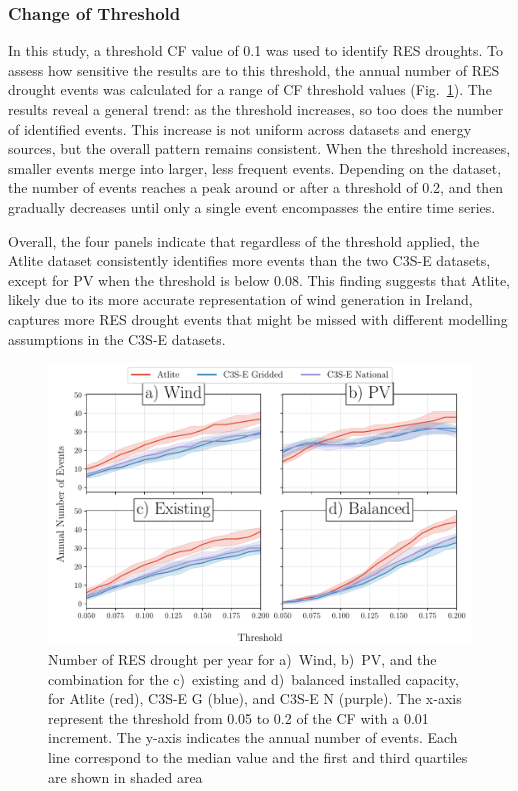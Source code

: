 \documentclass[a4paper, 11pt]{article}
\begin{document}
\newpage
\subsubsection{Change of Threshold}

In this study, a threshold CF value of 0.1 was used to identify RES droughts. To assess how sensitive the results are to this threshold, the annual number of RES drought events was calculated for a range of CF threshold values (Fig.~\ref{fig:number_days_threshold}). The results reveal a general trend: as the threshold increases, so too does the number of identified events. This increase is not uniform across datasets and energy sources, but the overall pattern remains consistent. When the threshold increases, smaller events merge into larger, less frequent events. Depending on the dataset, the number of events reaches a peak around or after a threshold of 0.2, and then gradually decreases until only a single event encompasses the entire time series.

Overall, the four panels indicate that regardless of the threshold applied, the Atlite dataset consistently identifies more events than the two C3S-E datasets, except for PV when the threshold is below 0.08. This finding suggests that Atlite, likely due to its more accurate representation of wind generation in Ireland, captures more RES drought events that might be missed with different modelling assumptions in the C3S-E datasets.

\begin{figure}[!ht]
	\centering
	\includegraphics[width=\textwidth]{droughts_varying_threshold}
	\caption{Number of RES drought per year for a)~Wind, b)~PV, and the combination for the c)~existing and d)~balanced installed capacity, for Atlite (red), C3S-E G (blue), and C3S-E N (purple). The x-axis represent the threshold from 0.05 to 0.2 of the CF with a 0.01 increment. The y-axis indicates the annual number of events. Each line correspond to the median value and the first and third quartiles are shown in shaded area}
	\label{fig:number_days_threshold}
\end{figure}
\end{document}
